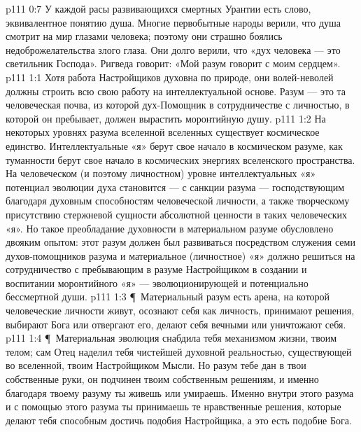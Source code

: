 \vs p111 0:7 У каждой расы развивающихся смертных Урантии есть слово, эквивалентное понятию душа. Многие первобытные народы верили, что душа смотрит на мир глазами человека; поэтому они страшно боялись недоброжелательства злого глаза. Они долго верили, что «дух человека --- это светильник Господа». Ригведа говорит: «Мой разум говорит с моим сердцем».
\vs p111 1:1 Хотя работа Настройщиков духовна по природе, они волей\hyp{}неволей должны строить всю свою работу на интеллектуальной основе. Разум --- это та человеческая почва, из которой дух\hyp{}Помощник в сотрудничестве с личностью, в которой он пребывает, должен вырастить моронтийную душу.
\vs p111 1:2 На некоторых уровнях разума вселенной вселенных существует космическое единство. Интеллектуальные «я» берут свое начало в космическом разуме, как туманности берут свое начало в космических энергиях вселенского пространства. На человеческом (и поэтому личностном) уровне интеллектуальных «я» потенциал эволюции духа становится --- с санкции разума --- господствующим благодаря духовным способностям человеческой личности, а также творческому присутствию стержневой сущности абсолютной ценности в таких человеческих «я». Но такое преобладание духовности в материальном разуме обусловлено двояким опытом: этот разум должен был развиваться посредством служения семи духов\hyp{}помощников разума и материальное (личностное) «я» должно решиться на сотрудничество с пребывающим в разуме Настройщиком в создании и воспитании моронтийного «я» --- эволюционирующей и потенциально бессмертной души.
\vs p111 1:3 \P\ Материальный разум есть арена, на которой человеческие личности живут, осознают себя как личность, принимают решения, выбирают Бога или отвергают его, делают себя вечными или уничтожают себя.
\vs p111 1:4 \P\ Материальная эволюция снабдила тебя механизмом жизни, твоим телом; сам Отец наделил тебя чистейшей духовной реальностью, существующей во вселенной, твоим Настройщиком Мысли. Но разум тебе дан в твои собственные руки, он подчинен твоим собственным решениям, и именно благодаря твоему разуму ты живешь или умираешь. Именно внутри этого разума и с помощью этого разума ты принимаешь те нравственные решения, которые делают тебя способным достичь подобия Настройщика, а это есть подобие Бога.
